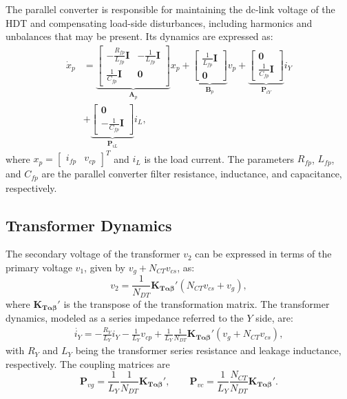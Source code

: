 The parallel converter is responsible for maintaining the dc-link voltage of the HDT and compensating load-side disturbances, including harmonics and unbalances that may be present. Its dynamics are expressed as:
\begin{align}
    \dot{x}_p &=
        \underbrace{\begin{bmatrix}
            -\tfrac{R_{fp}}{L_{fp}} \mathbf{I} & -\tfrac{1}{L_{fp}} \mathbf{I}\\
             \tfrac{1}{C_{fp}} \mathbf{I} & \mathbf{0}
        \end{bmatrix}}_{\mathbf{A}_p}
        x_p
        +
        \underbrace{\begin{bmatrix}
            \tfrac{1}{L_{fp}}\mathbf{I}\\
            \mathbf{0}
        \end{bmatrix}}_{\mathbf{B}_p} v_p
        +
        \underbrace{\begin{bmatrix}
            \mathbf{0}\\
            \tfrac{1}{C_{fp}}\mathbf{I}
        \end{bmatrix}}_{\mathbf{P}_{iY}} i_Y\\
        &+
        \underbrace{\begin{bmatrix}
            \mathbf{0}\\
            -\tfrac{1}{C_{fp}}\mathbf{I}
        \end{bmatrix}}_{\mathbf{P}_{iL}} i_L ,
    \label{eq:ParallelConverter}
\end{align}
where $x_p = \begin{bmatrix} i_{fp} & v_{cp} \end{bmatrix}^T$ and $i_L$ is the load current. The parameters $R_{fp}$, $L_{fp}$, and $C_{fp}$ are the parallel converter filter resistance, inductance, and capacitance, respectively.

\subsection{Transformer Dynamics}

The secondary voltage of the transformer $v_2$ can be expressed in terms of the primary voltage $v_1$, given by $v_g + N_{CT} v_{cs}$, as:
\begin{equation}
    v_2 = \frac{1}{N_{DT}} \mathbf{K_{T\alpha\beta}}' (N_{CT} v_{cs} + v_g),
\end{equation}
where $\mathbf{K_{T\alpha\beta}}'$ is the transpose of the transformation matrix. The transformer dynamics, modeled as a series impedance referred to the $Y$ side, are:
\begin{align}
    \dot{i_Y} = -\frac{R_Y}{L_Y}i_Y - \frac{1}{L_Y} v_{cp}
    + \frac{1}{L_Y}\frac{1}{N_{DT}} \mathbf{K_{T\alpha\beta}}'(v_g + N_{CT} v_{cs}),
    \label{eq:Transformer}
\end{align}
with $R_Y$ and $L_Y$ being the transformer series resistance and leakage inductance, respectively. The coupling matrices are
\[
    \mathbf{P}_{vg} = \frac{1}{L_Y}\frac{1}{N_{DT}} \mathbf{K_{T\alpha\beta}}', \qquad
    \mathbf{P}_{vc} = \frac{1}{L_Y}\frac{N_{CT}}{N_{DT}} \mathbf{K_{T\alpha\beta}}' .
\]


